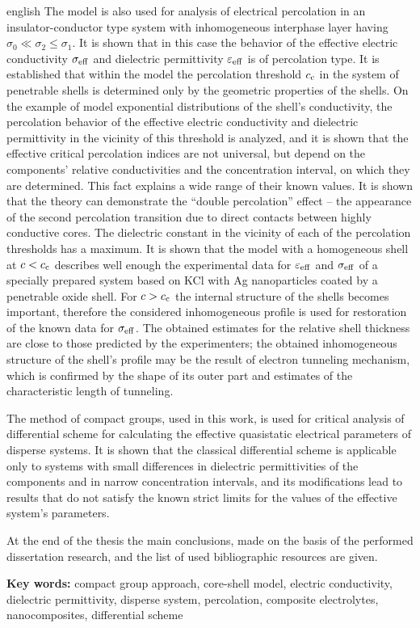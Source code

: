 \begin{otherlanguage*}{english}
The model is also used for analysis of electrical percolation in an insulator-conductor type system with inhomogeneous interphase layer having $ \sigma_0 \ll \sigma_2 \leq \sigma_1 $. It is shown that in this case the behavior of the effective electric conductivity $ \sigma _ {\rm eff} $ and dielectric permittivity $ \varepsilon _ {\rm eff} $ is of percolation type.
It is established that within the model the percolation threshold $ c _ {\rm c} $ in the system of penetrable shells is determined only by the geometric properties of the shells.  On the example of model exponential distributions of the shell's conductivity, the percolation behavior of the effective electric conductivity and dielectric permittivity in the vicinity of this threshold is analyzed, and it is shown that the effective critical percolation indices are not universal, but depend on the components' relative conductivities and the concentration interval, on which they are determined. This fact explains a wide range of their known values.
It is shown that the theory can demonstrate the ``double percolation'' effect -- the appearance of the second percolation transition due to direct contacts between highly conductive cores. The dielectric constant in the vicinity of each of the percolation thresholds has a maximum.
It is shown that the model with a homogeneous shell at $ c <c _ {\rm c} $ describes well enough the experimental data for $ \varepsilon _ {\rm eff} $ and $ \sigma _ {\rm eff} $ of a specially prepared system based on KCl with Ag nanoparticles coated by a penetrable oxide shell. For $ c> c _ {\rm c} $ the internal structure of the shells becomes important, therefore the considered inhomogeneous profile is used for restoration of the known data for $ \sigma _ {\rm eff} $. The obtained estimates for the relative shell thickness are close to those predicted by the experimenters; the obtained inhomogeneous structure of the shell's profile may be the result of electron tunneling mechanism, which is confirmed by the shape of its outer part and estimates of the characteristic length of tunneling.

The method of compact groups, used in this work, is used for critical analysis of differential scheme for calculating the effective quasistatic electrical parameters of disperse systems. It is shown that the classical differential scheme is applicable only to systems with small differences in dielectric permittivities of the components and in narrow concentration intervals, and its modifications lead to results that do not satisfy the known strict limits for the values of the effective system's parameters.

At the end of the thesis the main conclusions, made on the basis of the performed dissertation research, and the list of used bibliographic resources are given.

\vskip 15pt
\textbf{Key words:} compact group approach, core-shell model, electric conductivity, dielectric permittivity, disperse system, percolation, composite electrolytes, nanocomposites, differential scheme

\end{otherlanguage*}